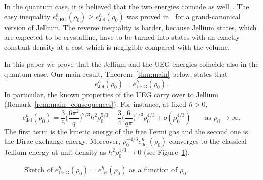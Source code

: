 \documentclass[final,reqno]{amsart}
\theoremstyle{remark}
\theoremstyle{definition}
\renewcommand{\ge}{\geqslant}
\newcommand{\TF}{\mathrm{TF}}
\newcommand{\UEG}{\mathrm{UEG}}
\newcommand{\Jel}{\mathrm{Jel}}
\begin{document}
In the quantum case, it is believed that the two energies coincide as well~\cite[Sec.~2.2]{lewin2020local}. The easy inequality $e_\UEG^\hbar(\rho_0)\ge e_\Jel^\hbar(\rho_0)$ was proved in~\cite{lewin2018statistical} for a grand-canonical version of Jellium. The reverse inequality is harder, because Jellium states, which are expected to be crystalline, have to be turned into states with an exactly constant density at a cost which is negligible compared with the volume.

In this paper we prove that the Jellium and the UEG energies coincide also in the quantum case. Our main result, Theorem~\ref{thm:main} below, states that
\[
\boxed{e^\hbar_\Jel(\rho_0)=e^\hbar_\UEG(\rho_0).}
\]
In particular, the known properties of the UEG carry over to Jellium (Remark~\ref{rem:main_consequences}). For instance, at fixed $\hbar>0$,
\[
e^\hbar_\Jel(\rho_0)=\frac35\Big(\frac{6\pi^2}{q}\Big)^{2/3}\hbar^2\rho_0^{5/3}-\frac34\Big(\frac{6}{q\pi}\Big)^{1/3}\rho_0^{4/3}+o(\rho_0^{4/3})\qquad\text{as }\rho_0\to\infty.
\]
The first term is the kinetic energy of the free Fermi gas and the second one is the Dirac exchange energy. Moreover, $\rho_0^{-4/3}e^\hbar_\Jel(\rho_0)$ converges to the classical Jellium energy at unit density as $\hbar^2\rho_0^{1/3}\to0$ (see Figure~\ref{fig:energy_shape}).
\begin{figure}[ht]
\centering
{}
\caption{Sketch of $e^\hbar_\UEG(\rho_0)=e^\hbar_\Jel(\rho_0)$ as a function of $\rho_0$.}
\label{fig:energy_shape}
\end{figure}
\vspace{.3em}\\
\end{document}
